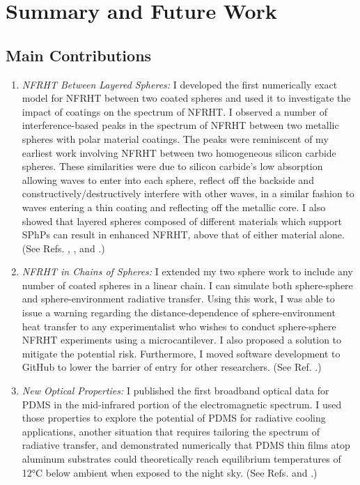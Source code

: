 \chapter[Summary and Future Work][Summary and Future Work]{Summary and Future Work} \label{ch:Summary}

\section{Main Contributions}
%
\begin{enumerate}
\item \textit{NFRHT Between Layered Spheres:} I developed the first numerically exact model for NFRHT between two coated spheres and used it to investigate the impact of coatings on the spectrum of NFRHT. I observed a number of interference-based peaks in the spectrum of NFRHT between two metallic spheres with polar material coatings. The peaks were reminiscent of my earliest work involving NFRHT between two homogeneous silicon carbide spheres.\cite{Czapla2014} These similarities were due to silicon carbide's low absorption allowing waves to enter into each sphere, reflect off the backside and constructively/destructively interfere with other waves, in a similar fashion to waves entering a thin coating and reflecting off the metallic core. I also showed that layered spheres composed of different materials which support SPhPs can result in enhanced NFRHT, above that of either material alone. (See Refs. , , and .)
\item \textit{NFRHT in Chains of Spheres:} I extended my two sphere work to include any number of coated spheres in a linear chain. I can simulate both sphere-sphere and sphere-environment radiative transfer. Using this work, I was able to issue a warning regarding the distance-dependence of sphere-environment heat transfer to any experimentalist who wishes to conduct sphere-sphere NFRHT experiments using a microcantilever. I also proposed a solution to mitigate the potential risk. Furthermore, I moved software development to GitHub\cite{Narayanaswamy2018} to lower the barrier of entry for other researchers. (See Ref. .)
\item \textit{New Optical Properties:} I published the first broadband optical data for PDMS in the mid-infrared portion of the electromagnetic spectrum. I used those properties to explore the potential of PDMS for radiative cooling applications, another situation that requires tailoring the spectrum of radiative transfer, and demonstrated numerically that PDMS thin films atop aluminum substrates could theoretically reach equilibrium temperatures of 12\si{\celsius} below ambient when exposed to the night sky. (See Refs.  and .)
\end{enumerate}


